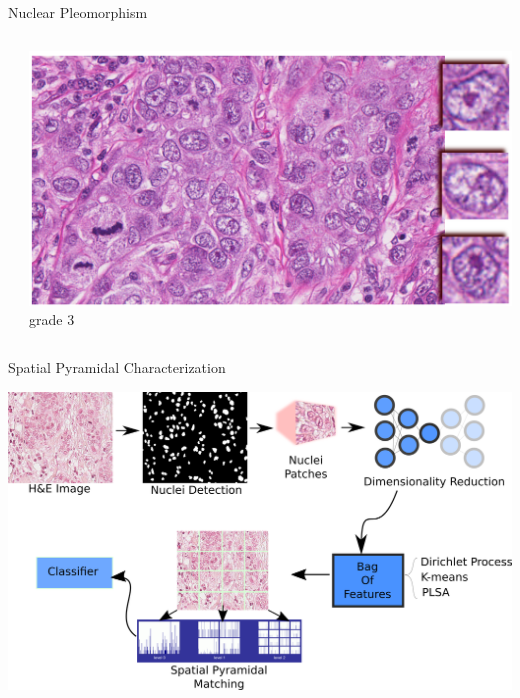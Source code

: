 \documentclass[usenames,dvipsnames]{beamer}
\begin{document}
\begin{frame}{Nuclear Pleomorphism}
{\begin{columns}
\begin{column}{0.33\textwidth}
\end{column}

\begin{column}{0.33\textwidth}
\includegraphics[width=\textwidth]{imagenes/grado3.png}
\\\centering \scriptsize grade 3

\end{column}

\end{columns}
      
  }
\end{frame}



\begin{frame}{Spatial Pyramidal Characterization }

\includegraphics[width=\textwidth]{imagenes_cnn/metodonuevo.png}
    
\end{frame}
\end{document}
